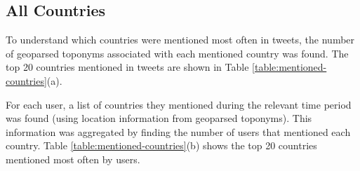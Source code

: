 \subsection{All Countries}

To understand which countries were mentioned most often in tweets, the number of geoparsed toponyms associated with each mentioned country was found. The top 20 countries mentioned in tweets are shown in Table \ref{table:mentioned-countries}(a).

For each user, a list of countries they mentioned during the relevant time period was found (using location information from geoparsed toponyms). This information was aggregated by finding the number of users that mentioned each country. Table \ref{table:mentioned-countries}(b) shows the top 20 countries mentioned most often by users.

